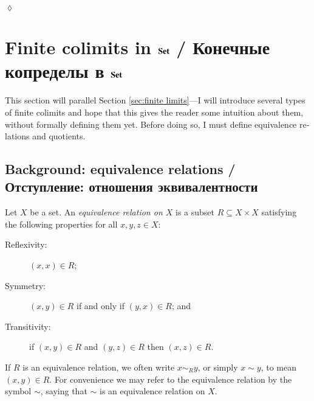 \documentclass{book}
\def\ss{\subseteq}
\def\Set{{\bf Set}}
\theoremstyle{theoremENG}
\theoremstyle{lemmaENG}
\theoremstyle{propositionENG}
\theoremstyle{corollaryENG}
\theoremstyle{factENG}
\theoremstyle{remarkENG}
\theoremstyle{exampleENG}
\theoremstyle{warningENG}
\theoremstyle{questionENG}
\theoremstyle{guessENG}
\theoremstyle{answerENG}
\theoremstyle{constructionENG}
\theoremstyle{rulesENG}
\theoremstyle{excENG}
\newtheorem{excENG}[subsubsection]{\begin{english}Exercise\end{english}}
\theoremstyle{appENG}
\theoremstyle{definitionENG}
\newtheorem{definitionENG}[subsubsection]{\begin{english}Definition\end{english}}
\theoremstyle{notationENG}
\theoremstyle{conjectureENG}
\theoremstyle{postulateENG}
\newenvironment{exerciseENG}{\begin{excENG}}{\hspace*{\fill}$\lozenge$\end{excENG}}
\theoremstyle{theoremRUS}
\theoremstyle{lemmaRUS}
\theoremstyle{propositionRUS}
\theoremstyle{corollaryRUS}
\theoremstyle{factRUS}
\theoremstyle{remarkRUS}
\theoremstyle{exampleRUS}
\theoremstyle{warningRUS}
\theoremstyle{questionRUS}
\theoremstyle{guessRUS}
\theoremstyle{answerRUS}
\theoremstyle{constructionRUS}
\theoremstyle{rulesRUS}
\theoremstyle{excRUS}
\theoremstyle{appRUS}
\theoremstyle{definitionRUS}
\theoremstyle{notationRUS}
\theoremstyle{conjectureRUS}
\theoremstyle{postulateRUS}
\begin{document}
\begin{english}
\begin{exerciseENG}
\begin{russian} \end{russian}

\end{exerciseENG}


\section{Finite colimits in $\Set$ / Конечные копределы в $\Set$}\label{sec:finite colimits}

This section will parallel Section \ref{sec:finite limits}---I will introduce several types of finite colimits and hope that this gives the reader some intuition about them, without formally defining them yet. Before doing so, I must define equivalence relations and quotients.

\begin{russian} \end{russian}


\subsection{Background: equivalence relations / Отступление: отношения эквивалентности}

\begin{definitionENG}

Let $X$ be a set. An {\em equivalence relation on $X$} is a subset $R\ss X\times X$ satisfying the following properties for all $x,y,z\in X$:
\begin{description}
\item[Reflexivity:] $(x,x)\in R$;
\item[Symmetry:] $(x,y)\in R$ if and only if $(y,x)\in R$; and
\item[Transitivity:] if $(x,y)\in R$ and $(y,z)\in R$ then $(x,z)\in R$.
\end{description}
If $R$ is an equivalence relation, we often write $x\sim_R y$, or simply $x\sim y$, to mean $(x,y)\in R$. For convenience we may refer to the equivalence relation by the symbol $\sim$, saying that $\sim$ is an equivalence relation on $X$.

\begin{russian} \end{russian}


\end{definitionENG}
\end{english}
\end{document}
